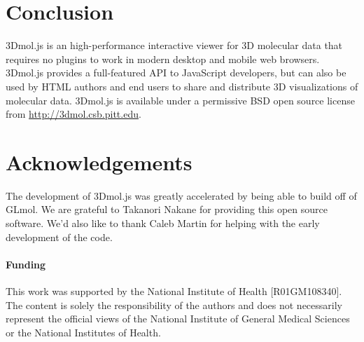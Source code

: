 \documentclass[]{bioinfo}
\begin{document}
\section{Conclusion}
3Dmol.js is an high-performance interactive viewer for 3D molecular data that requires no plugins to work in modern desktop and mobile web browsers.
3Dmol.js provides a full-featured API to JavaScript developers, but can also be used by HTML authors and end users to share and distribute
3D visualizations of molecular data. 3Dmol.js is available under a permissive BSD open source license from \url{http://3dmol.csb.pitt.edu}.
 
\section*{Acknowledgements}
The development of 3Dmol.js was greatly accelerated by being able to build off of GLmol.  We
are grateful to Takanori Nakane for providing this open source software. 
We'd also like to thank Caleb Martin for helping with the early development of the code.

\paragraph{Funding\textcolon} 
This work was supported by the National Institute of Health [R01GM108340].
The content is solely the responsibility of the authors and does not necessarily
represent the official views of the National Institute of General Medical Sciences
or the National Institutes of Health.



\end{document}
